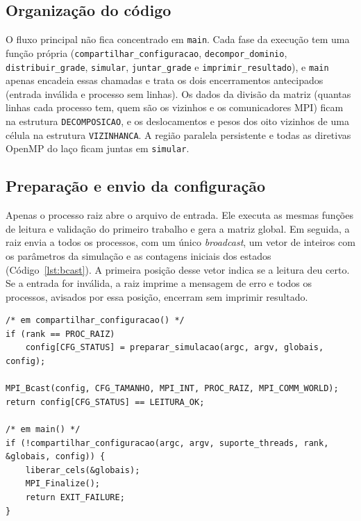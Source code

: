 \documentclass[11pt,a4paper]{article}
\begin{document}
\subsection{Organização do código}

O fluxo principal não fica concentrado em \texttt{main}. Cada fase da execução tem uma função própria (\texttt{compartilhar\_configuracao}, \texttt{decompor\_dominio}, \texttt{distribuir\_grade}, \texttt{simular}, \texttt{juntar\_grade} e \texttt{imprimir\_resultado}), e \texttt{main} apenas encadeia essas chamadas e trata os dois encerramentos antecipados (entrada inválida e processo sem linhas). Os dados da divisão da matriz (quantas linhas cada processo tem, quem são os vizinhos e os comunicadores MPI) ficam na estrutura \texttt{DECOMPOSICAO}, e os deslocamentos e pesos dos oito vizinhos de uma célula na estrutura \texttt{VIZINHANCA}. A região paralela persistente e todas as diretivas OpenMP do laço ficam juntas em \texttt{simular}.

\subsection{Preparação e envio da configuração}

Apenas o processo raiz abre o arquivo de entrada. Ele executa as mesmas funções de leitura e validação do primeiro trabalho e gera a matriz global. Em seguida, a raiz envia a todos os processos, com um único \emph{broadcast}, um vetor de inteiros com os parâmetros da simulação e as contagens iniciais dos estados (Código~\ref{lst:bcast}). A primeira posição desse vetor indica se a leitura deu certo. Se a entrada for inválida, a raiz imprime a mensagem de erro e todos os processos, avisados por essa posição, encerram sem imprimir resultado.

\begin{lstlisting}[caption={Envio do resultado da leitura, dos parâmetros e das contagens iniciais a todos os processos.},label={lst:bcast}]
/* em compartilhar_configuracao() */
if (rank == PROC_RAIZ)
    config[CFG_STATUS] = preparar_simulacao(argc, argv, globais, config);

MPI_Bcast(config, CFG_TAMANHO, MPI_INT, PROC_RAIZ, MPI_COMM_WORLD);
return config[CFG_STATUS] == LEITURA_OK;

/* em main() */
if (!compartilhar_configuracao(argc, argv, suporte_threads, rank, &globais, config)) {
    liberar_cels(&globais);
    MPI_Finalize();
    return EXIT_FAILURE;
}
\end{lstlisting}
\end{document}
